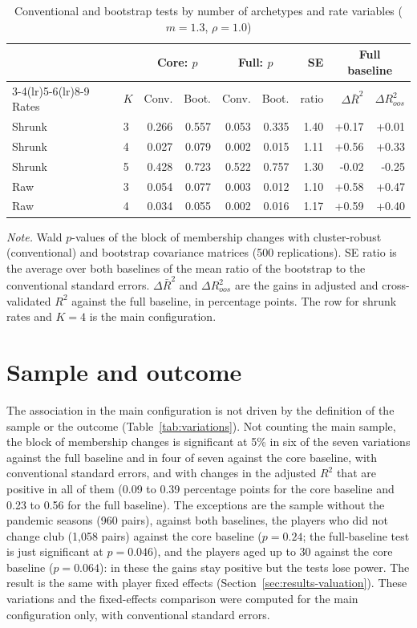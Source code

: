 \begin{table}[ht]
	\centering
	\small
	\caption{Conventional and bootstrap tests by number of archetypes and rate variables ($m=1.3$, $\rho=1.0$)}
	\label{tab:bootstrap-K}
	\begin{tabular}{llrrrrrrr}
		\toprule
		 & & \multicolumn{2}{c}{Core: $p$} & \multicolumn{2}{c}{Full: $p$} & SE & \multicolumn{2}{c}{Full baseline} \\
		\cmidrule(lr){3-4}\cmidrule(lr){5-6}\cmidrule(lr){8-9}
		Rates & $K$ & Conv. & Boot. & Conv. & Boot. & ratio & $\Delta\bar R^2$ & $\Delta R^2_{oos}$ \\
		\midrule
Shrunk & 3 & 0.266 & 0.557 & 0.053 & 0.335 & 1.40 & +0.17 & +0.01 \\
Shrunk & 4 & 0.027 & 0.079 & 0.002 & 0.015 & 1.11 & +0.56 & +0.33 \\
Shrunk & 5 & 0.428 & 0.723 & 0.522 & 0.757 & 1.30 & -0.02 & -0.25 \\
Raw & 3 & 0.054 & 0.077 & 0.003 & 0.012 & 1.10 & +0.58 & +0.47 \\
Raw & 4 & 0.034 & 0.055 & 0.002 & 0.016 & 1.17 & +0.59 & +0.40 \\
		\bottomrule
	\end{tabular}
	\par\smallskip
	\parbox{0.95\textwidth}{\footnotesize\emph{Note.} Wald $p$-values of the block of membership changes with cluster-robust (conventional) and bootstrap covariance matrices (500 replications). SE ratio is the average over both baselines of the mean ratio of the bootstrap to the conventional standard errors. $\Delta\bar R^2$ and $\Delta R^2_{oos}$ are the gains in adjusted and cross-validated $R^2$ against the full baseline, in percentage points. The row for shrunk rates and $K=4$ is the main configuration.}
\end{table}

\section{Sample and outcome}
\label{sec:rob-sample}

The association in the main configuration is not driven by the definition of the sample or the outcome (Table~\ref{tab:variations}). Not counting the main sample, the block of membership changes is significant at 5\% in six of the seven variations against the full baseline and in four of seven against the core baseline, with conventional standard errors, and with changes in the adjusted $R^2$ that are positive in all of them (0.09 to 0.39 percentage points for the core baseline and 0.23 to 0.56 for the full baseline). The exceptions are the sample without the pandemic seasons (960 pairs), against both baselines, the players who did not change club (1,058 pairs) against the core baseline ($p=0.24$; the full-baseline test is just significant at $p=0.046$), and the players aged up to 30 against the core baseline ($p=0.064$): in these the gains stay positive but the tests lose power. The result is the same with player fixed effects (Section~\ref{sec:results-valuation}). These variations and the fixed-effects comparison were computed for the main configuration only, with conventional standard errors.

